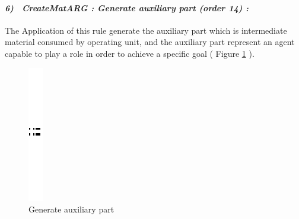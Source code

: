 \paragraph{\emph{6)~ CreateMatARG : Generate auxiliary part (order 14) :} }
The Application of this rule generate the auxiliary part which is intermediate material consumed by operating unit, and the auxiliary part represent an agent capable to play a role in order to achieve a specific goal ( Figure \ref{fig:Generate auxiliary part} ).
\vspace{1cm}
\begin{figure}[th]
\centering 
	\quad{}
		\includegraphics{ch3/img/sep}
	\quad{}
\caption{\label{fig:Generate auxiliary part} Generate auxiliary part}
\end{figure}
\pagebreak


